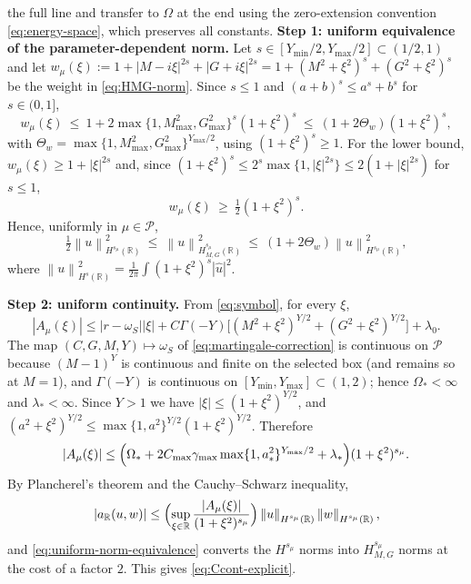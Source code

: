 \documentclass[11pt]{amsart}
\theoremstyle{remark}
\newcommand{\R}{\mathbb{R}}
\newcommand{\Pset}{\mathcal{P}}
\newcommand{\norm}[1]{\left\lVert #1\right\rVert}
\newcommand{\rf}{r}
\begin{document}
the full line and transfer to $\Omega$ at the end using
the zero-extension convention
\eqref{eq:energy-space}, which preserves all constants.
\medskip\noindent
\textbf{Step 1: uniform equivalence of the parameter-dependent norm.}
Let $s\in[Y_{\min}/2,Y_{\max}/2]\subset(1/2,1)$ and let
$w_\mu(\xi):=1+|M-i\xi|^{2s}+|G+i\xi|^{2s}
=1+(M^2+\xi^2)^{s}+(G^2+\xi^2)^{s}$ be the weight in
\eqref{eq:HMG-norm}.  Since $s\le1$ and $(a+b)^s\le a^s+b^s$ for $s\in(0,1]$,
\[
  w_\mu(\xi)\ \le\ 1+2\max\{1,M_{\max}^2,G_{\max}^2\}^{s}(1+\xi^2)^{s}
  \ \le\ (1+2\Theta_w)(1+\xi^2)^{s},
\]
with $\Theta_w=\max\{1,M_{\max}^2,G_{\max}^2\}^{Y_{\max}/2}$, using
$(1+\xi^2)^s\ge1$.  For the lower bound, $w_\mu(\xi)\ge1+|\xi|^{2s}$ and,
since $(1+\xi^2)^s\le2^s\max\{1,|\xi|^{2s}\}\le2(1+|\xi|^{2s})$ for
$s\le1$,
\[
  w_\mu(\xi)\ \ge\ \tfrac12(1+\xi^2)^{s}.
\]
Hence, uniformly in $\mu\in\Pset$,
\begin{equation}
  \tfrac12\norm{u}_{H^{s_\mu}(\R)}^2
  \ \le\ \norm{u}_{H^{s_\mu}_{M,G}(\R)}^2
  \ \le\ (1+2\Theta_w)\norm{u}_{H^{s_\mu}(\R)}^2 ,
  \label{eq:uniform-norm-equivalence}
\end{equation}
where $\norm{u}_{H^{s}(\R)}^2=\tfrac1{2\pi}\int(1+\xi^2)^{s}|\widehat u|^2$.

\medskip\noindent
\textbf{Step 2: uniform continuity.}
From \eqref{eq:symbol}, for every $\xi$,
\[
  |A_\mu(\xi)|
  \le|\rf-\omega_S||\xi|
   +C\Gamma(-Y)\bigl[(M^2+\xi^2)^{Y/2}+(G^2+\xi^2)^{Y/2}\bigr]
   +\lambda_0 .
\]
The map $(C,G,M,Y)\mapsto\omega_S$ of \eqref{eq:martingale-correction} is
continuous on $\Pset$ because $(M-1)^Y$ is continuous and finite on the selected box
(and remains so at $M=1$), and $\Gamma(-Y)$ is continuous on $[Y_{\min},Y_{\max}]\subset(1,2)$;
hence $\Omega_\ast<\infty$ and $\lambda_\ast<\infty$.  Since $Y>1$ we have
$|\xi|\le(1+\xi^2)^{Y/2}$, and
$(a^2+\xi^2)^{Y/2}\le\max\{1,a^2\}^{Y/2}(1+\xi^2)^{Y/2}$.  Therefore
\begin{equation}
  |A_\mu(\xi)|
  \le\Bigl(\Omega_\ast+2C_{\max}\gamma_{\max}\max\{1,a_\ast^2\}^{Y_{\max}/2}
   +\lambda_\ast\Bigr)(1+\xi^2)^{s_\mu}.
  \label{eq:uniform-symbol-upper}
\end{equation}
By Plancherel's theorem and the Cauchy--Schwarz inequality,
\[
  |a_\R(u,w)|
  \le\Bigl(\sup_{\xi\in\R}\frac{|A_\mu(\xi)|}{(1+\xi^2)^{s_\mu}}\Bigr)
  \norm{u}_{H^{s_\mu}(\R)}\norm{w}_{H^{s_\mu}(\R)},
\]
and
\eqref{eq:uniform-norm-equivalence} converts the $H^{s_\mu}$ norms into
$H^{s_\mu}_{M,G}$ norms at the cost of a factor $2$.  This gives
\eqref{eq:Ccont-explicit}.
\end{document}
